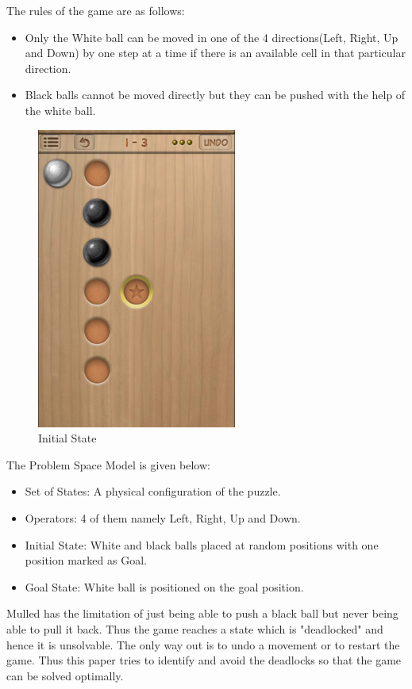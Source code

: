 \documentclass[letterpaper]{article}
\begin{document}
The rules of the game are as follows:
\begin{itemize}
\item Only the White ball can be moved in one of the 4 directions(Left, Right, Up and Down) by one step at a time if there is an available cell in that particular direction.
\item Black balls cannot be moved directly but they can be pushed with the help of the white ball.
\end{itemize}

\begin{figure}
\centering
\includegraphics[scale=.5]{Initial-State-Level-3.png} \caption{Initial State}
\label{fig:Initial1}
\end{figure}

The Problem Space Model is given below:
\begin{itemize}
\item Set of States: A physical configuration of the puzzle.
\item Operators: 4 of them namely Left, Right, Up and Down.
\item Initial State: White and black balls placed at random positions with one position marked as Goal.
\item Goal State: White ball is positioned on the goal position. 
\end{itemize}


Mulled has the limitation of just being able to push a black ball but never being able to pull it back. Thus the game reaches a state which is "deadlocked" and hence it is unsolvable. The only way out is to undo a movement or to restart the game. Thus this paper tries to identify and avoid the deadlocks so that the game can be solved optimally.
\end{document}
